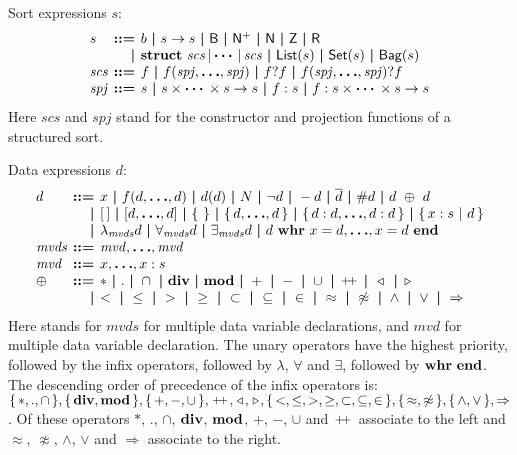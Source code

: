 \documentclass[a4paper,fleqn,10pt]{article}
\makeatletter
\newcommand{\f}[1]{\ensuremath{\mathit{#1}}}
\newcommand{\sbool}{\ensuremath{\mathsf{B}}}
\newcommand{\snat}{\ensuremath{\mathsf{N}}}
\newcommand{\spos}{\ensuremath{\snat^{+}}}
\newcommand{\sint}{\ensuremath{\mathsf{Z}}}
\newcommand{\sreal}{\ensuremath{\mathsf{R}}}
\newenvironment{tightarray}[1]
  {\setlength{\arraycolsep}{2pt}%
   \begin{array}{@{}#1@{}}%
  }
  {\end{array}%
  }
\newcommand{\set}[1]{\ensuremath{\{\,#1\,\}}}
\newcommand{\scompr}[2]{\ensuremath{\set{#1\ |\ #2}}}
\newcommand{\el}{\ensuremath{[\,]}}
\newcommand{\cons}{\ensuremath{\hspace{0.12em}\triangleright\hspace{0.08em}}}
\newcommand{\snoc}{\ensuremath{\hspace{0.08em}\triangleleft\hspace{0.12em}}}
\newcommand{\concat}{\ensuremath{\hspace{0.12em}\raisebox{0.2ex}
{\text{\footnotesize+}\!\text{\footnotesize+}}\hspace{0.12em}}}
\newcommand{\limp}{\ensuremath{\Rightarrow}}
\newcommand{\mb}[1]{\text{\boldmath$#1$}}
\newcommand{\kwstruct}{{\bf struct}}
\newcommand{\kwwhr}{{\bf whr}}
\newcommand{\kwend}{{\bf end}}
\newcommand{\kwdiv}{{\bf div}}
\newcommand{\kwmod}{{\bf mod}}
\makeatother
\begin{document}
Sort expressions $s$:
\[\begin{tightarray}{lrl}
s      & \mb{::=} & b\ \mb{|}\ s \to s\ \mb{|}\ 
               \sbool\ \mb{|}\ \spos\ \mb{|}\ \snat\ \mb{|}\ \sint\ \mb{|}\ \sreal\\
       & \mb{|}   &
               \kwstruct\ \f{scs}\,|\,\mb{\cdots}\,|\,\f{scs}\ \mb{|}\ 
               \mathsf{List}(s)\ \mb{|}\ \mathsf{Set}(s)\ \mb{|}\ \mathsf{Bag}(s)\\
\f{scs} & \mb{::=} & f\ \mb{|}\ f(\f{spj},\mb{\ldots},\f{spj})\ \mb{|}\ 
                f ? f\ \mb{|}\ f(\f{spj},\mb{\ldots},\f{spj})?f \\
\f{spj} & \mb{::=} & s\ \mb{|}\ s \times \mb{\cdots} \times s \to s\ \mb{|}\ 
                f: s\ \mb{|}\ f: s \times \mb{\cdots} \times s \to s
\end{tightarray}\]
Here $\f{scs}$ and $\f{spj}$ stand for the constructor and projection
functions of a structured sort.

Data expressions $d$:
\[\begin{tightarray}{lrl}
d      & \mb{::=} & x\ \mb{|}\ f(d, \mb{\ldots}, d)\ \mb{|}\ d(d)\ \mb{|}\ N\ \mb{|}\ 
               \lnot d\ \mb{|}\ -d\ \mb{|}\ \overline{d}\ \mb{|}\ \#d\ \mb{|}\ d\ \oplus\ d\\
       & \mb{|} & \el\ \mb{|}\ [d,\mb{\ldots},d]\ \mb{|}\ \set{}\ \mb{|}\ \set{d,\mb{\ldots},d}\ \mb{|}\ 
               \set{d: d,\mb{\ldots},d: d}\ \mb{|}\ \scompr{x: s}{d}\\
       & \mb{|} & \lambda_{\f{mvds}} d\ \mb{|}\ 
               \forall_{\f{mvds}} d\ \mb{|}\ \exists_{\f{mvds}} d\ \mb{|}\ 
               d\ \kwwhr\ x=d,\mb{\ldots},x=d\ \kwend\\
\f{mvds}&\mb{::=} & \f{mvd},\mb{\ldots},\f{mvd}\\
\f{mvd}& \mb{::=} & x,\mb{\ldots},x: s\\
\oplus & \mb{::=} & *\ \mb{|}\ .\ \mb{|}\ \cap\ \mb{|}\ 
               \kwdiv\ \mb{|}\ \kwmod\ \mb{|}\ 
               +\ \mb{|}\ -\ \mb{|}\ \cup\ \mb{|}\ 
               \concat\ \mb{|}\ 
               \snoc\ \mb{|}\ 
               \cons\\
       & \mb{|} &
               <\ \mb{|}\ \leq\ \mb{|}\ >\ \mb{|}\ \geq\ \mb{|}\ \subset\ \mb{|}\ \subseteq\ \mb{|}\ \in\ \mb{|}\ 
               \approx\ \mb{|}\ \not\approx\ \mb{|}\ 
               \land\ \mb{|}\ \lor\ \mb{|}\ 
               \limp
\end{tightarray}\]
Here stands for $\f{mvds}$ for multiple data variable declarations,
and $\f{mvd}$ for multiple data variable declaration.
The unary operators have the highest priority, followed by the infix operators,
followed by $\lambda$, $\forall$ and $\exists$, followed by $\kwwhr\ \kwend$.
The descending order of precedence of the infix operators is:
$\set{*, ., \cap}, \set{\kwdiv, \kwmod}, \set{+, -, \cup}, \concat, \snoc,
\cons, \set{<, \leq, >, \geq, \subset, \subseteq, \in}, \set{\approx,\not\approx},
\set{\land, \lor}, \limp$.
Of these operators $*$, $.$, $\cap$, $\kwdiv$, $\kwmod$, $+$, $-$, $\cup$ and
$\concat$ associate to the left and $\approx$, $\not\approx$, $\land$, $\lor$
and $\limp$ associate to the right.
\end{document}
